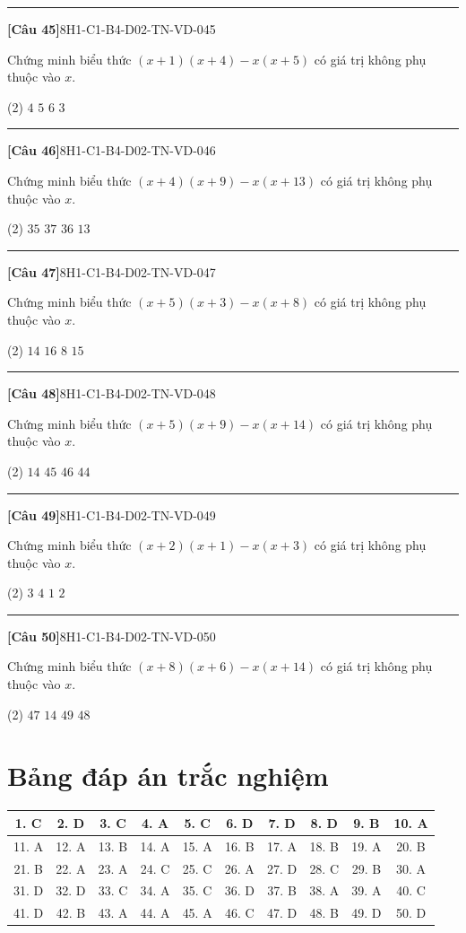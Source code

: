 \documentclass[12pt,a4paper]{article}
\newif\ifloigiai
\newenvironment{cauhoi}[2]{%
  \par\medskip\noindent\rule{\textwidth}{0.4pt}\par\nopagebreak
  \noindent\textbf{[#1]}\hfill{\scriptsize\ttfamily #2}\par\nopagebreak\smallskip}{\par}
\newcommand{\dapan}[1]{\ifloigiai\par\smallskip\noindent\textit{Đáp án:} \textbf{#1}\par\fi}
\begin{document}
\begin{cauhoi}{Câu 45}{8H1-C1-B4-D02-TN-VD-045}
Chứng minh biểu thức $(x+1)(x+4)-x(x+5)$ có giá trị không phụ thuộc vào $x$.
\begin{tasks}(2)
\task $4$
\task $5$
\task $6$
\task $3$
\end{tasks}
\dapan{A}
\end{cauhoi}
\begin{cauhoi}{Câu 46}{8H1-C1-B4-D02-TN-VD-046}
Chứng minh biểu thức $(x+4)(x+9)-x(x+13)$ có giá trị không phụ thuộc vào $x$.
\begin{tasks}(2)
\task $35$
\task $37$
\task $36$
\task $13$
\end{tasks}
\dapan{C}
\end{cauhoi}
\begin{cauhoi}{Câu 47}{8H1-C1-B4-D02-TN-VD-047}
Chứng minh biểu thức $(x+5)(x+3)-x(x+8)$ có giá trị không phụ thuộc vào $x$.
\begin{tasks}(2)
\task $14$
\task $16$
\task $8$
\task $15$
\end{tasks}
\dapan{D}
\end{cauhoi}
\begin{cauhoi}{Câu 48}{8H1-C1-B4-D02-TN-VD-048}
Chứng minh biểu thức $(x+5)(x+9)-x(x+14)$ có giá trị không phụ thuộc vào $x$.
\begin{tasks}(2)
\task $14$
\task $45$
\task $46$
\task $44$
\end{tasks}
\dapan{B}
\end{cauhoi}
\begin{cauhoi}{Câu 49}{8H1-C1-B4-D02-TN-VD-049}
Chứng minh biểu thức $(x+2)(x+1)-x(x+3)$ có giá trị không phụ thuộc vào $x$.
\begin{tasks}(2)
\task $3$
\task $4$
\task $1$
\task $2$
\end{tasks}
\dapan{D}
\end{cauhoi}
\begin{cauhoi}{Câu 50}{8H1-C1-B4-D02-TN-VD-050}
Chứng minh biểu thức $(x+8)(x+6)-x(x+14)$ có giá trị không phụ thuộc vào $x$.
\begin{tasks}(2)
\task $47$
\task $14$
\task $49$
\task $48$
\end{tasks}
\dapan{D}
\end{cauhoi}
\clearpage\section*{Bảng đáp án trắc nghiệm}
\begin{center}\begin{tabular}{|c|c|c|c|c|c|c|c|c|c|}
\hline
1. C & 2. D & 3. C & 4. A & 5. C & 6. D & 7. D & 8. D & 9. B & 10. A\\\hline
11. A & 12. A & 13. B & 14. A & 15. A & 16. B & 17. A & 18. B & 19. A & 20. B\\\hline
21. B & 22. A & 23. A & 24. C & 25. C & 26. A & 27. D & 28. C & 29. B & 30. A\\\hline
31. D & 32. D & 33. C & 34. A & 35. C & 36. D & 37. B & 38. A & 39. A & 40. C\\\hline
41. D & 42. B & 43. A & 44. A & 45. A & 46. C & 47. D & 48. B & 49. D & 50. D\\\hline
\end{tabular}\end{center}
\end{document}
